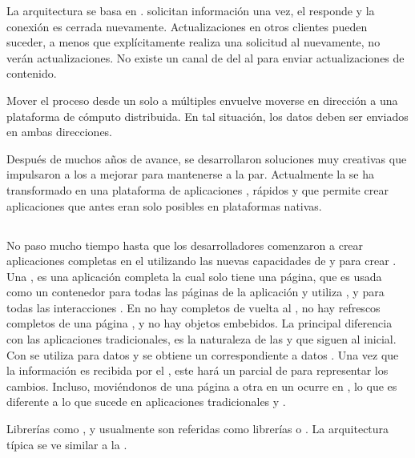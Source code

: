 La arquitectura \clientserver se basa en \statelessconnectionsINT. \clientsAS solicitan información una vez, el \serverAS responde y la conexión es cerrada nuevamente. Actualizaciones en otros clientes pueden suceder, a menos que explícitamente realiza una solicitud al \serverAS nuevamente, no verán actualizaciones. No existe un canal de \feedback del \serverAS al \clientAS para enviar actualizaciones de contenido.

Mover el proceso desde un solo \serverAS a múltiples \clientsAS envuelve moverse en dirección a una plataforma de cómputo distribuida. En tal situación, los datos deben ser enviados en ambas direcciones.

Después de muchos años de avance, se desarrollaron soluciones muy creativas que impulsaron a los \browsersINT a mejorar para mantenerse a la par. 
Actualmente la \webINT se ha transformado en una plataforma de aplicaciones \fullyfeatured, \runtimesCPT \javaScriptNAME rápidos y \standard \htmlfive que permite crear aplicaciones que antes eran solo posibles en plataformas nativas.

\subsection{\singlePageAppINT}

No paso mucho tiempo hasta que los desarrolladores comenzaron a crear aplicaciones completas en el \browserINT utilizando las nuevas capacidades de \javaScriptNAME y \htmlfive para crear \singlePageAppINT. Una \spa, es una aplicación \webINT completa la cual solo tiene una página, que es usada como un contenedor para todas las páginas \webINT de la aplicación y utiliza \javaScriptNAME, \htmlfive y \cssNAME para todas las interacciones \frontEndsAS. En \spas no hay \posts completos de vuelta al \serverAS, no hay refrescos completos de una página \webINT, y no hay objetos embebidos. La principal diferencia con las aplicaciones \webINT tradicionales, es la naturaleza de las \requests y \responsesINT que siguen al \requestINT \httpNAME inicial. Con \spa se utiliza \ajaxNAME para \requestINT datos y se obtiene un \responsesINT correspondiente a datos \jsonNAME. Una vez que la información es recibida por el \clientAS, este hará un \renderCPT parcial de \htmlNAME para representar los cambios. Incluso, moviéndonos de una página a otra en un \spa ocurre en \clientSideAS, lo que es diferente a lo que sucede en aplicaciones tradicionales y \ria.

Librerías como \backbonejsNAME \emberjsNAME, y \angularjsNAME usualmente son referidas como librerías \clientSideAS \mvcAS o \mvvmAS. La arquitectura típica \clientSideAS \mvcAS se ve similar a la . 

